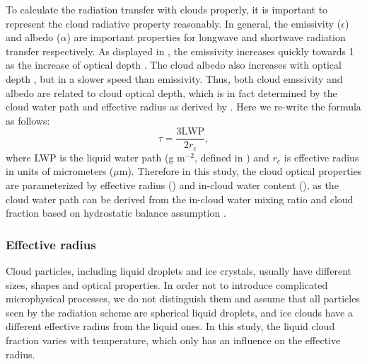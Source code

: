 To calculate the radiation transfer with clouds properly, it is important to represent the cloud radiative property reasonably. In general, the emissivity ($\epsilon$) and albedo ($\alpha$) are important properties for longwave and shortwave radiation transfer respectively. As displayed in , the emissivity increases quickly towards 1 as the increase of optical depth \citep[see Eq. (2) in ][]{Liou1990remote}. The cloud albedo also increases with optical depth \citep[see Eq. (12) of][]{Painemal2012}, but in a slower speed than emissivity. Thus, both cloud emssivity and albedo are related to cloud optical depth, which is in fact determined by the cloud water path and effective radius as derived by \cite{Stephens1978radiation}. Here we re-write the formula as follows:
\begin{equation}
    \tau = \frac{3\text{LWP}}{2 r_e},
    \label{eq:cld_tau_lwp_re}
\end{equation}
where LWP is the liquid water path (g m$^{-2}$, defined in ) and $r_e$ is effective radius in units of micrometers ($\mu$m). Therefore in this study, the cloud optical properties are parameterized by effective radius () and in-cloud water content (), as the cloud water path can be derived from the in-cloud water mixing ratio and cloud fraction based on hydrostatic balance assumption \citep[Eq. 9.30 in][]{Stensrud2007}.

\subsubsection{Effective radius}
\label{sec:effective_radius}

Cloud particles, including liquid droplets and ice crystals, usually have different sizes, shapes and optical properties. In order not to introduce complicated microphysical processes, we do not distinguish them and assume that all particles seen by the radiation scheme are spherical liquid droplets, and ice clouds have a different effective radius from the liquid ones. In this study, the liquid cloud fraction varies with temperature, which only has an influence on the effective radius. %

